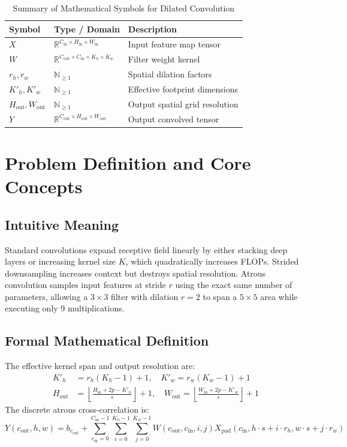 \documentclass[11pt,a4paper]{article}
\theoremstyle{definition}
\begin{document}
\begin{table}[h]
\centering
\caption{Summary of Mathematical Symbols for Dilated Convolution}
\begin{tabular}{lll}
\toprule
\textbf{Symbol} & \textbf{Type / Domain} & \textbf{Description} \\
\midrule
$X$ & $\mathbb{R}^{C_{\text{in}} \times H_{\text{in}} \times W_{\text{in}}}$ & Input feature map tensor \\
$W$ & $\mathbb{R}^{C_{\text{out}} \times C_{\text{in}} \times K_h \times K_w}$ & Filter weight kernel \\
$r_h, r_w$ & $\mathbb{N}_{\ge 1}$ & Spatial dilation factors \\
$K'_h, K'_w$ & $\mathbb{N}_{\ge 1}$ & Effective footprint dimensions \\
$H_{\text{out}}, W_{\text{out}}$ & $\mathbb{N}_{\ge 1}$ & Output spatial grid resolution \\
$Y$ & $\mathbb{R}^{C_{\text{out}} \times H_{\text{out}} \times W_{\text{out}}}$ & Output convolved tensor \\
\bottomrule
\end{tabular}
\end{table}

\section{Problem Definition and Core Concepts}

\subsection{Intuitive Meaning}
Standard convolutions expand receptive field linearly by either stacking deep layers or increasing kernel size $K$, which quadratically increases FLOPs. Strided downsampling increases context but destroys spatial resolution. Atrous convolution samples input features at stride $r$ using the exact same number of parameters, allowing a $3 \times 3$ filter with dilation $r=2$ to span a $5 \times 5$ area while executing only 9 multiplications.

\subsection{Formal Mathematical Definition}
The effective kernel span and output resolution are:
\begin{align}
K'_h &= r_h(K_h - 1) + 1, \quad K'_w = r_w(K_w - 1) + 1 \\
H_{\text{out}} &= \left\lfloor \frac{H_{\text{in}} + 2p - K'_h}{s} \right\rfloor + 1, \quad W_{\text{out}} = \left\lfloor \frac{W_{\text{in}} + 2p - K'_w}{s} \right\rfloor + 1
\end{align}
The discrete atrous cross-correlation is:
\begin{equation}
Y(c_{\text{out}}, h, w) = b_{c_{\text{out}}} + \sum_{c_{\text{in}}=0}^{C_{\text{in}}-1} \sum_{i=0}^{K_h-1} \sum_{j=0}^{K_w-1} W(c_{\text{out}}, c_{\text{in}}, i, j) X_{\text{pad}}(c_{\text{in}}, h \cdot s + i \cdot r_h, w \cdot s + j \cdot r_w)
\end{equation}
\end{document}
